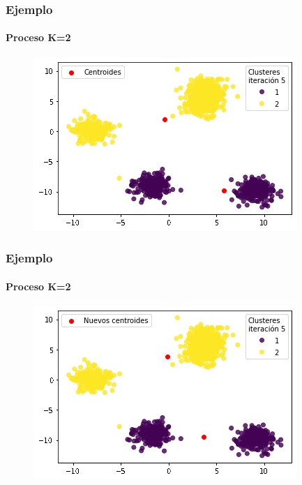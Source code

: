 \documentclass[
  shownotes,
  xcolor={svgnames},
  hyperref={colorlinks,citecolor=DarkBlue,linkcolor=DarkRed,urlcolor=DarkBlue}
  , aspectratio=169]{beamer}
\begin{document}
\begin{frame}
\frametitle{Ejemplo}
\framesubtitle{Proceso K=2}


\begin{figure}[H] \centering

    \centering
    \includegraphics[scale=.7]{figures/k2_7.jpg}
  \\
  \tiny
\end{figure}


\end{frame}
\begin{frame}
\frametitle{Ejemplo}
\framesubtitle{Proceso K=2}


\begin{figure}[H] \centering

    \centering
    \includegraphics[scale=.7]{figures/k2_8.jpg}
  \\
  \tiny
\end{figure}



\end{frame}
\end{document}
